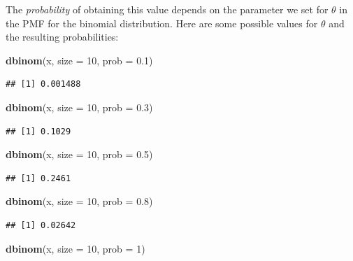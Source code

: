 \documentclass[12pt,]{krantz}
\newenvironment{Shaded}{\begin{snugshade}}{\end{snugshade}}
\newcommand{\DataTypeTok}[1]{\textcolor[rgb]{0.13,0.29,0.53}{#1}}
\newcommand{\DecValTok}[1]{\textcolor[rgb]{0.00,0.00,0.81}{#1}}
\newcommand{\FloatTok}[1]{\textcolor[rgb]{0.00,0.00,0.81}{#1}}
\newcommand{\KeywordTok}[1]{\textcolor[rgb]{0.13,0.29,0.53}{\textbf{#1}}}
\newcommand{\NormalTok}[1]{#1}
\begin{document}
The \emph{probability} of obtaining this value depends on the parameter we set for \(\theta\) in the PMF for the binomial distribution. Here are some possible values for \(\theta\) and the resulting probabilities:

\begin{Shaded}
\begin{Highlighting}[]
\KeywordTok{dbinom}\NormalTok{(x, }\DataTypeTok{size =} \DecValTok{10}\NormalTok{, }\DataTypeTok{prob =} \FloatTok{0.1}\NormalTok{)}
\end{Highlighting}
\end{Shaded}

\begin{verbatim}
## [1] 0.001488
\end{verbatim}

\begin{Shaded}
\begin{Highlighting}[]
\KeywordTok{dbinom}\NormalTok{(x, }\DataTypeTok{size =} \DecValTok{10}\NormalTok{, }\DataTypeTok{prob =} \FloatTok{0.3}\NormalTok{)}
\end{Highlighting}
\end{Shaded}

\begin{verbatim}
## [1] 0.1029
\end{verbatim}

\begin{Shaded}
\begin{Highlighting}[]
\KeywordTok{dbinom}\NormalTok{(x, }\DataTypeTok{size =} \DecValTok{10}\NormalTok{, }\DataTypeTok{prob =} \FloatTok{0.5}\NormalTok{)}
\end{Highlighting}
\end{Shaded}

\begin{verbatim}
## [1] 0.2461
\end{verbatim}

\begin{Shaded}
\begin{Highlighting}[]
\KeywordTok{dbinom}\NormalTok{(x, }\DataTypeTok{size =} \DecValTok{10}\NormalTok{, }\DataTypeTok{prob =} \FloatTok{0.8}\NormalTok{)}
\end{Highlighting}
\end{Shaded}

\begin{verbatim}
## [1] 0.02642
\end{verbatim}

\begin{Shaded}
\begin{Highlighting}[]
\KeywordTok{dbinom}\NormalTok{(x, }\DataTypeTok{size =} \DecValTok{10}\NormalTok{, }\DataTypeTok{prob =} \DecValTok{1}\NormalTok{)}
\end{Highlighting}
\end{Shaded}
\end{document}
